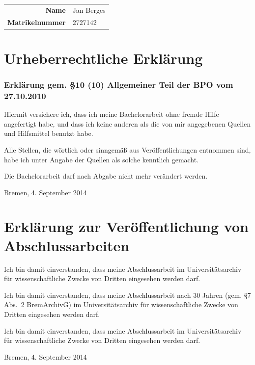 \documentclass[a4paper, 10pt, twoside, openany]{book} %
\begin{document}
\bigskip

\begin{flushright}
    \begin{tabular}{r l}
        \textbf{Name} & Jan Berges \\
        \textbf{Matrikelnummer} & 2727142
    \end{tabular}
\end{flushright}

\bigskip

\section*{Urheberrechtliche Erklärung}

\subsubsection*{Erklärung gem. \S 10 (10) Allgemeiner Teil der BPO vom 27.10.2010}

Hiermit versichere ich, dass ich meine Bachelorarbeit ohne fremde Hilfe angefertigt habe, und dass ich keine anderen als die von mir angegebenen Quellen und Hilfsmittel benutzt habe.

Alle Stellen, die wörtlich oder sinngemäß aus Veröffentlichungen entnommen sind, habe ich unter Angabe der Quellen als solche kenntlich gemacht.

Die Bachelorarbeit darf nach Abgabe nicht mehr verändert werden.

\vspace{1cm}

\begin{flushright}
    Bremen, 4. September 2014
\end{flushright}

\vspace{1cm}

\section*{Erklärung zur Veröffentlichung von Abschlussarbeiten}

Ich bin damit einverstanden, dass meine Abschlussarbeit im Universitätsarchiv für wissenschaftliche Zwecke von Dritten eingesehen werden darf.

Ich bin damit einverstanden, dass meine Abschlussarbeit nach 30 Jahren (gem. \S 7 Abs.~2 \mbox{BremArchivG}) im Universitätsarchiv für wissenschaftliche Zwecke von Dritten eingesehen werden darf.

Ich bin damit einverstanden, dass meine Abschlussarbeit im Universitätsarchiv für wissenschaftliche Zwecke von Dritten eingesehen werden darf.

\vspace{1cm}

\begin{flushright}
    Bremen, 4. September 2014
\end{flushright}

\listoffigures


\end{document}
